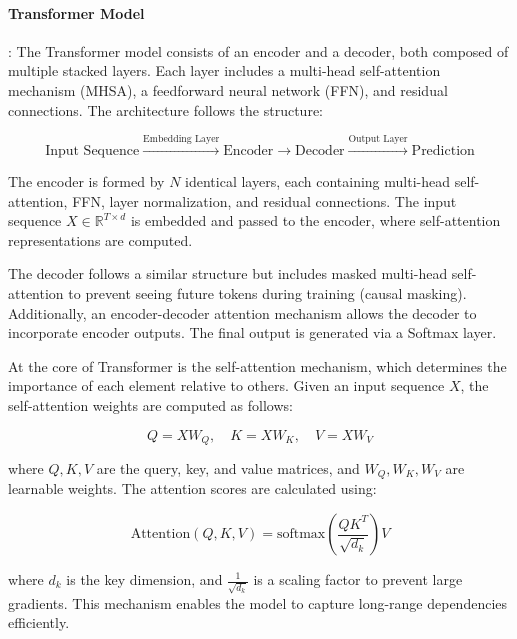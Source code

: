 \documentclass[acmsmall]{acmart}
\begin{document}
\paragraph{Transformer Model}: The Transformer model \cite{vaswani2017attention} consists of an encoder and a decoder, both composed of multiple stacked layers. Each layer includes a multi-head self-attention mechanism (MHSA), a feedforward neural network (FFN), and residual connections. The architecture follows the structure:

\begin{equation*}
\text{Input Sequence} \xrightarrow{\text{Embedding Layer}} \text{Encoder} \rightarrow \text{Decoder} \xrightarrow{\text{Output Layer}} \text{Prediction}
\end{equation*}

The encoder is formed by $N$ identical layers, each containing multi-head self-attention, FFN, layer normalization, and residual connections. The input sequence $X \in \mathbb{R}^{T \times d}$ is embedded and passed to the encoder, where self-attention representations are computed.

The decoder follows a similar structure but includes masked multi-head self-attention to prevent seeing future tokens during training (causal masking). Additionally, an encoder-decoder attention mechanism allows the decoder to incorporate encoder outputs. The final output is generated via a Softmax layer.

At the core of Transformer is the self-attention mechanism, which determines the importance of each element relative to others. Given an input sequence $X$, the self-attention weights are computed as follows:

\begin{equation}
Q = X W_Q, \quad K = X W_K, \quad V = X W_V
\end{equation}

where $Q, K, V$ are the query, key, and value matrices, and $W_Q, W_K, W_V$ are learnable weights. The attention scores are calculated using:

\begin{equation}
\text{Attention}(Q, K, V) = \text{softmax} \left(\frac{Q K^T}{\sqrt{d_k}} \right) V
\end{equation}

where $d_k$ is the key dimension, and $\frac{1}{\sqrt{d_k}}$ is a scaling factor to prevent large gradients. This mechanism enables the model to capture long-range dependencies efficiently.
\end{document}
